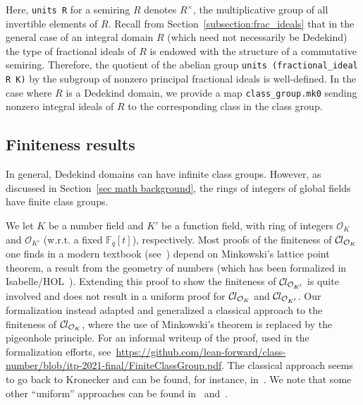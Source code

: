\documentclass[sn-mathphys]{sn-jnl}%
\newcommand{\lean}[1]{\texttt{#1}\xspace}
\newcommand*{\OK}[1][K]{\mathcal{O}_{#1}}
\newcommand*{\Cl}{\mathcal{C}\kern-.075em l}
\newcommand*{\Fq}[1][q]{\mathbb{F}_{#1}}
\begin{document}
Here, \lean{units R} for a semiring $R$ denotes $R^\times$, the multiplicative group of all invertible elements of $R$.
Recall from Section~\ref{subsection:frac_ideals} that in the general case of an integral domain $R$ (which need not necessarily be Dedekind) the type of fractional ideals of $R$ is endowed with the structure of a commutative semiring.
Therefore, the quotient of the abelian group \lean{units (fractional\_ideal R K)} by the subgroup of nonzero principal fractional ideals is well-defined.
In the case where $R$ is a Dedekind domain, we provide a map \lean{class\_group.mk0} sending nonzero integral ideals of $R$ to the corresponding class in the class group.

\subsection{Finiteness results}\label{subsec:finiteness}

In general, Dedekind domains can have infinite class groups. However, as discussed in Section~\ref{sec math background}, the rings of integers of global fields have finite class groups.

We let $K$ be a number field and $K'$ be a function field, with ring of integers $\OK$ and $\OK[K']$ (w.r.t. a fixed $\Fq[q][t]$), respectively. 
Most proofs of the finiteness of $\Cl_{\OK}$ one finds in a modern textbook (see~\cite[Theorems 4.4,~5.3,~6.3]{Neukirch}) depend on Minkowski's lattice point theorem, a result from the geometry of numbers (which has been formalized in Isabelle/HOL~\cite{Minkowskis_Theorem-AFP}).
Extending this proof to show the finiteness of $\Cl_{\OK[K']}$ is quite involved and does not result in a uniform proof for $\Cl_{\OK}$ and $\Cl_{\OK[K']}$.
Our formalization instead adapted and generalized a classical approach to the finiteness of $\Cl_{\OK}$, where the use of Minkowski's theorem is replaced by the pigeonhole principle. 
For an informal writeup of the proof, used in the formalization efforts, see~\url{https://github.com/lean-forward/class-number/blob/itp-2021-final/FiniteClassGroup.pdf}.
The classical approach seems to go back to Kronecker
and can be found, for instance, in~\cite{Ireland-Rosen}.
We note that some other ``uniform'' approaches can be found in~\cite{Artin-Whaples} and~\cite{Stasinski}.
\end{document}
